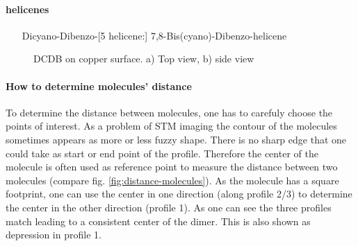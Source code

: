 \paragraph{helicenes}
\begin{itemize}
\item[Dicyano-Dibenzo-[5]helicene:] 7,8-Bis(cyano)-Dibenzo-helicene
\end{itemize}


\begin{figure}[ht]
 \centering
\caption{DCDB on copper surface. a) Top view, b) side view}
\end{figure}

\paragraph{How to determine molecules' distance}
To determine the distance between molecules, one has to carefuly choose the points of interest. As a problem of STM imaging the contour of the molecules sometimes appears as more or less fuzzy shape. There is no sharp edge that one could take as start or end point of the profile. Therefore the center of the molecule is often used as reference point to measure the distance between two molecules (compare fig. \ref{fig:distance-molecules}). As the molecule has a square footprint, one can use the center in one direction (along profile 2/3) to determine the center in the other direction (profile 1). As one can see the three profiles match leading to a consistent center of the dimer. This is also shown as depression in profile 1. 


